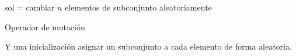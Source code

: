 \documentclass[13pt,a4paper]{article}
\begin{document}
\begin{algorithm}[H]
    \SetAlgoLined
        sol = cambiar $n$ elementos de subconjunto aleatoriamente \;
    \caption{Operador de mutación}
\end{algorithm}

\vspace{\baselineskip}

Y una inicialización asignar un subconjunto a cada elemento de forma aleatoria.






    \setlength{\parskip}{1em}
    \newpage
\end{document}
